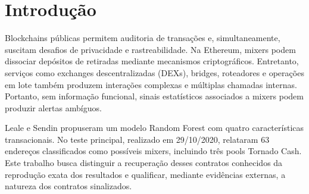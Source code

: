 \documentclass[11pt,a4paper]{article}
\begin{document}
\begin{otherlanguage}{english}
\begin{abstract}
Detecting Ethereum smart contracts offering mixing services is relevant to blockchain forensics, yet similar transaction patterns also arise in decentralized services with different purposes. This study examines the reproducibility and limitations of a four-feature Random Forest mixer detector. In a reproduction involving 1,114,702 transactions from October 29, 2020, all three reference Tornado Cash pools were recovered, but nine addresses were flagged at the 0.50 threshold compared with 63 in the original study. Holding the model and threshold fixed, changing the minimum eligible transaction count from one to twenty reduced the number of alerts from 49 to seven. In a functional audit of a previously executed January 15, 2026 evaluation, an external source confirmed transaction hash, sender, recipient, and date for 18 out of 18 sampled transactions; their log pagination was subsequently completed. Observed functionality included bridges, cross-chain routers, and batch operations. These findings highlight the sensitivity of alerts to population-selection rules and the need for execution context and explicit coverage checks. The original alert-count discrepancy remains unexplained, and missing independent labels prevent claims of overall precision or predictive superiority.
\end{abstract}
\end{otherlanguage}

\section{Introdução}
Blockchains públicas permitem auditoria de transações e, simultaneamente, suscitam desafios de privacidade e rastreabilidade. Na Ethereum, mixers podem dissociar depósitos de retiradas mediante mecanismos criptográficos. Entretanto, serviços como exchanges descentralizadas (DEXs), bridges, roteadores e operações em lote também produzem interações complexas e múltiplas chamadas internas. Portanto, sem informação funcional, sinais estatísticos associados a mixers podem produzir alertas ambíguos.

Leale e Sendin \citep{leale2025mixers} propuseram um modelo Random Forest \citep{breiman2001random} com quatro características transacionais. No teste principal, realizado em 29/10/2020, relataram 63 endereços classificados como possíveis mixers, incluindo três pools Tornado Cash. Este trabalho busca distinguir a recuperação desses contratos conhecidos da reprodução exata dos resultados e qualificar, mediante evidências externas, a natureza dos contratos sinalizados.
\end{document}
